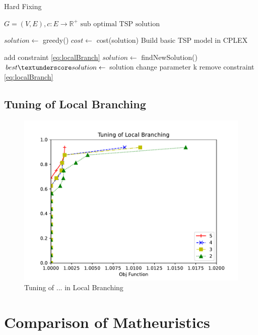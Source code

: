 \begin{algorithm}
    \caption{Hard Fixing}\label{algo:SoftFixing}
    \begin{algorithmic}[1]
    \Require $G = (V,E), c:E \to \mathbb{R}^+$
    \Ensure $\text{sub optimal TSP solution}$

    \State $solution \gets$ greedy()
    \State $cost \gets $ cost(solution)
    \State Build basic TSP model in CPLEX



    \State add constraint \ref{eq:localBranch}
    \State $solution \gets$ findNewSolution()
    \State $ best\textunderscore solution \gets$ solution
    \State change parameter k
    \EndIf
    \State remove constraint \ref{eq:localBranch}
    \EndWhile

    \end{algorithmic}
\end{algorithm}

\subsection{Tuning of Local Branching}
\begin{figure}[!h]
    \centering
    \includegraphics[width=\textwidth]{images/soft.pdf}
    \caption{Tuning of ...  in Local Branching}
    \label{fig:soft}
\end{figure}


\section{Comparison of Matheuristics}

